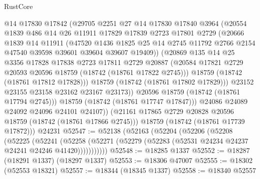 \begin{lexlean}{RustCore}
\begin{coremodule}
                @14
                @17830
                @17842
                (@29705
                  @2251
                  @27
                  @14
                  @17830
                  @17840
                  @3964
                  (@20554
                    @1839
                    @486
                    @14
                    @26
                    @11911
                    @17829
                    @17839
                    @2723
                    @17801
                    @2729
                    (@20666
                      @1839
                      @14
                      @11911
                      (@47520
                        @1436
                        @1825
                        @25
                        @14
                        @2745
                        @11792
                        @2766
                        @2154
                        @47540
                        @39598
                        @39601
                        @39604
                        @39607
                        @19409))
                    (@20869
                      @135
                      @14
                      @25
                      @3356
                      @17828
                      @17838
                      @2723
                      @17811
                      @2729
                      @20887
                      (@20584 @17821 @2729 @20593 @20596 @18759 (@18742 (@18761 @17822 @2745)))
                      @18759
                      (@18742 (@18761 @17812 @17828)))
                    @18759
                    (@18742 (@18761 @17802 @17829)))
                  @23152
                  @23155
                  @23158
                  @23162
                  @23167
                  @23173))
              @20596
              @18759
              (@18742 (@18761 @17794 @2745)))
            @18759
            (@18742 (@18761 @17747 @17847)))
          @24086
          @24089
          @24092
          @24096
          @24101
          @24107))
      (@21161 @17865 @2729 @20828 @20596 @18759 (@18742 (@18761 @17866 @2745)))
      @18759
      (@18742 (@18761 @17739 @17872)))
    @24231
@52547 := @52138
    (@52163
      (@52204
        (@52206
          (@52208
            (@52225
              (@52241
                (@52258
                  (@52271 (@52279 (@52283 (@52531 @24234 @24237 @24241 @24246 @41420)))))))))))
@52548 := @18285 @1337
@52552 := @18287 (@18291 @1337) (@18297 @1337)
@52553 := @18306 @47007
@52555 := @18302 (@52553 @18321)
@52557 := @18344 (@18345 @1337)
@52558 := @18340 @52557

\end{coremodule}
\end{lexlean}

